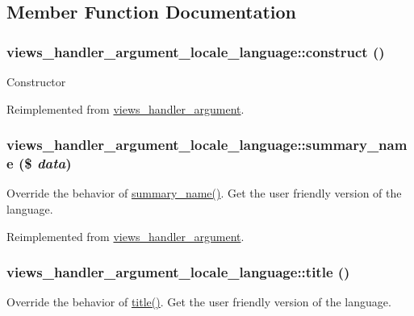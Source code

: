 \subsection{Member Function Documentation}
\hypertarget{classviews__handler__argument__locale__language_ade5af4ea7ada57c6716a6712bbc767c5}{
\subsubsection[{construct}]{\setlength{\rightskip}{0pt plus 5cm}views\_\-handler\_\-argument\_\-locale\_\-language::construct ()}}
\label{classviews__handler__argument__locale__language_ade5af4ea7ada57c6716a6712bbc767c5}
Constructor 

Reimplemented from \hyperlink{classviews__handler__argument_a93594a31e95e1a14cead4f038d7b321b}{views\_\-handler\_\-argument}.\hypertarget{classviews__handler__argument__locale__language_a1677e5e59d9e98999bf5781d7de21b39}{
\subsubsection[{summary\_\-name}]{\setlength{\rightskip}{0pt plus 5cm}views\_\-handler\_\-argument\_\-locale\_\-language::summary\_\-name (\$ {\em data})}}
\label{classviews__handler__argument__locale__language_a1677e5e59d9e98999bf5781d7de21b39}
Override the behavior of \hyperlink{classviews__handler__argument__locale__language_a1677e5e59d9e98999bf5781d7de21b39}{summary\_\-name()}. Get the user friendly version of the language. 

Reimplemented from \hyperlink{classviews__handler__argument_a4c55a340453eed4d35c69f7ac790cac1}{views\_\-handler\_\-argument}.\hypertarget{classviews__handler__argument__locale__language_a87bfadf6710bcc6bee4f734d258e7407}{
\subsubsection[{title}]{\setlength{\rightskip}{0pt plus 5cm}views\_\-handler\_\-argument\_\-locale\_\-language::title ()}}
\label{classviews__handler__argument__locale__language_a87bfadf6710bcc6bee4f734d258e7407}
Override the behavior of \hyperlink{classviews__handler__argument__locale__language_a87bfadf6710bcc6bee4f734d258e7407}{title()}. Get the user friendly version of the language. 

